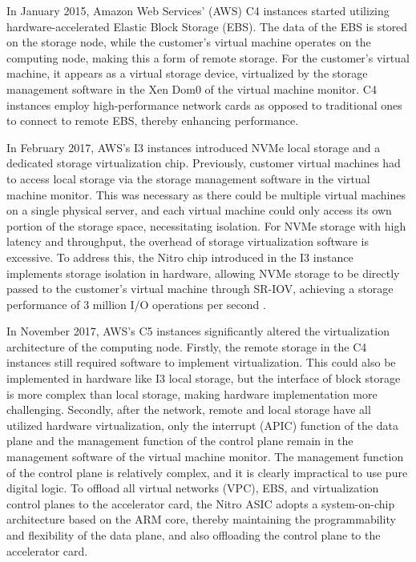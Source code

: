 In January 2015, Amazon Web Services' (AWS) C4 instances started utilizing hardware-accelerated Elastic Block Storage (EBS). The data of the EBS is stored on the storage node, while the customer's virtual machine operates on the computing node, making this a form of remote storage. For the customer's virtual machine, it appears as a virtual storage device, virtualized by the storage management software in the Xen Dom0 of the virtual machine monitor. C4 instances employ high-performance network cards as opposed to traditional ones to connect to remote EBS, thereby enhancing performance.

In February 2017, AWS's I3 instances introduced NVMe local storage and a dedicated storage virtualization chip. Previously, customer virtual machines had to access local storage via the storage management software in the virtual machine monitor. This was necessary as there could be multiple virtual machines on a single physical server, and each virtual machine could only access its own portion of the storage space, necessitating isolation. For NVMe storage with high latency and throughput, the overhead of storage virtualization software is excessive. To address this, the Nitro chip introduced in the I3 instance implements storage isolation in hardware, allowing NVMe storage to be directly passed to the customer's virtual machine through SR-IOV, achieving a storage performance of 3 million I/O operations per second \cite{aws-local-storage}.

In November 2017, AWS's C5 instances significantly altered the virtualization architecture of the computing node. Firstly, the remote storage in the C4 instances still required software to implement virtualization. This could also be implemented in hardware like I3 local storage, but the interface of block storage is more complex than local storage, making hardware implementation more challenging. Secondly, after the network, remote and local storage have all utilized hardware virtualization, only the interrupt (APIC) function of the data plane and the management function of the control plane remain in the management software of the virtual machine monitor. The management function of the control plane is relatively complex, and it is clearly impractical to use pure digital logic. To offload all virtual networks (VPC), EBS, and virtualization control planes to the accelerator card, the Nitro ASIC adopts a system-on-chip architecture based on the ARM core, thereby maintaining the programmability and flexibility of the data plane, and also offloading the control plane to the accelerator card.

